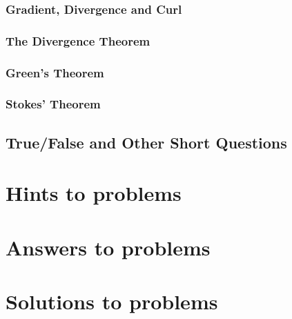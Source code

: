 \documentclass[12pt,letterpaper, openany]{book}
\begin{document}
\section{Gradient, Divergence and Curl}

\section{The Divergence Theorem}

\section{Green's Theorem}

\section{Stokes' Theorem}


\newpage
\chapter{True/False and Other Short Questions}









\newpage
\part{Hints to problems}


\newpage
\part{Answers to problems}


\newpage
\part{Solutions to problems}

\end{document}
